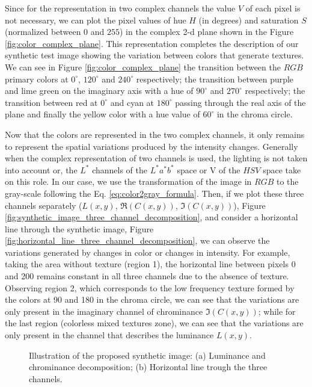Since for the representation in two complex channels the value $V$ of each pixel is not necessary, we can plot the pixel values of hue $H$ (in degrees) and saturation $S$ (normalized between $0$ and $255$) in the complex 2-d plane shown in the Figure \ref{fig:color_complex_plane}. This representation completes the description of our synthetic test image showing the variation between colors that generate textures. We can see in Figure \ref{fig:color_complex_plane} the transition between the $RGB$ primary colors at $0^\circ$, $120^\circ$ and $240^\circ$ respectively; the transition between purple and lime green on the imaginary axis with a hue of $90^\circ$ and $270^\circ$ respectively; the transition between red at $0^\circ$ and cyan at $180^\circ$ passing through the real axis of the plane and finally the yellow color with a hue value of $60^\circ$ in the chroma circle.

Now that the colors are represented in the two complex channels, it only remains to represent the spatial variations produced by the intensity changes. Generally when the complex representation of two channels is used, the lighting is not taken into account or, the $L^*$ channels of the $L^*a^*b^*$ space or V of the $HSV$ space take on this role. In our case, we use the transformation of the image in $RGB$ to the gray-scale following the Eq. \eqref{eq:color2gray_formula}. Then, if we plot these three channels separately ($L(x,y)$, $\Re(C(x,y))$, $\Im(C(x,y))$), Figure \ref{fig:synthetic_image_three_channel_decomposition}, and consider a horizontal line through the synthetic image, Figure \ref{fig:horizontal_line_three_channel_decomposition}, we can observe the variations generated by changes in color or changes in intensity. For example, taking the area without texture (region 1), the horizontal line between pixels 0 and 200 remains constant in all three channels due to the absence of texture. Observing region 2, which corresponds to the low frequency texture formed by the colors at 90 and 180 in the chroma circle, we can see that the variations are only present in the imaginary channel of chrominance $\Im(C(x,y))$; while for the last region (colorless mixed textures zone), we can see that the variations are only present in the channel that describes the luminance $L(x,y)$.

\begin{figure}
\centering
\caption{Illustration of the proposed synthetic image: (a) Luminance and chrominance decomposition; (b) Horizontal line trough the three channels.}\label{fig:three_channel_decomposition}
\end{figure}

